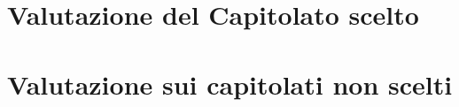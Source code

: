 \documentclass{article}
\newcommand{\gassets}{../../}
\begin{document}


\newpage

\tableofcontents

\newpage

\section{Valutazione del Capitolato scelto}

\pagebreak

\section{Valutazione sui capitolati non scelti}

\pagebreak

\pagebreak

\pagebreak

\pagebreak

\pagebreak

\end{document}
